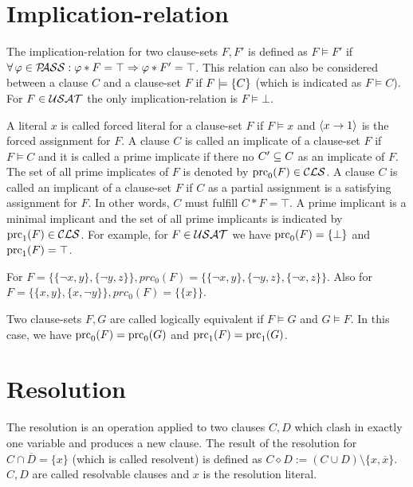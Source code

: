\documentclass[]{book}
\begin{document}
\section{Implication-relation}
\label{sec:imprel}

The implication-relation for two clause-sets $F, F'$ is defined as $F \models F'$ if $\forall\, \varphi \in \mathcal{P\hspace{-0.32em}ASS} : \varphi * F = \top \Rightarrow \varphi * F' = \top$. This relation can also be considered between a clause $C$ and a clause-set $F$ if $F \models \{ C \}$ (which is indicated as $F \models C$). For  $F \in \mathcal{USAT}$ the only implication-relation is $F \models \bot$. 

A literal $x$ is called forced literal for a clause-set $F$ if $F \models x$ and $\langle x \rightarrow 1 \rangle$ is the forced assignment for $F$. A clause $C$ is called an implicate of a clause-set $F$ if $F \models C$ and it is called a prime implicate if there no $ C' \subseteq C$ as an implicate of $F$. The set of all prime implicates of $F$ is denoted by $\operatorname{prc}_0(F) \in \mathcal{CLS}$. A clause $C$ is called an implicant of a clause-set $F$ if $C$ as a partial assignment is a satisfying assignment for $F$. In other words, $C$ must fulfill $C * F=\top$. A prime implicant is a minimal implicant and the set of all prime implicants is indicated by $\operatorname{prc}_1(F) \in \mathcal{CLS}$. For example, for $F \in \mathcal{USAT}$ we have $\operatorname{prc}_0(F) = \{ \bot \}$ and $\operatorname{prc}_1(F) = \top$.

\begin{examp}\label{exp:bbb}
For $F = \{\{ \neg x, y\} , \{ \neg y, z\}\}, prc_0(F) = \{\{\neg x, y\} , \{\neg y, z\} , \{\neg x, z\}\}$. Also for $F = \{\{x, y\} , \{x,\neg y\}\}, prc_0(F) = \{\{x\}\}$.
\end{examp}

Two clause-sets $F, G$ are called logically equivalent if $F \models G$ and $G \models F$. In this case, we have $\operatorname{prc}_0(F) = \operatorname{prc}_0(G)$ and $\operatorname{prc}_1(F) = \operatorname{prc}_1(G)$.

\section{Resolution}
\label{sec:Resolution}

The resolution is an operation applied to two clauses $C,D$ which clash in exactly one variable and produces a new clause. The result of the resolution for $C \cap \overline D = \{ x \}$ (which is called resolvent) is defined as $C \diamond D := (C \cup D) \setminus \{x, \overline x\} $. $C,D$ are called resolvable clauses and $x$ is the resolution literal.
\end{document}
